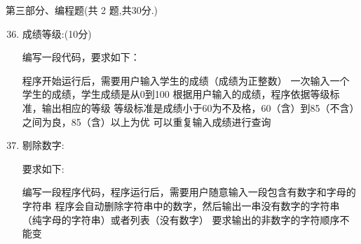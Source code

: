 \documentclass[11pt]{ctexart}
\begin{document}
    {\noindent\heiti 第三部分、编程题(共 2 题,共30分.)}
    \begin{enumerate}
        \setcounter{enumi}{35}
        
        \item 成绩等级:(10分)
        
        编写一段代码，要求如下：
        \begin{tasks}[label=\arabic*.]
            \task 程序开始运行后，需要用户输入学生的成绩（成绩为正整数）
            \task 一次输入一个学生的成绩，学生成绩是从0到100
            \task 根据用户输入的成绩，程序依据等级标准，输出相应的等级
            \task 等级标准是成绩小于60为不及格，60（含）到85（不含）之间为良，85（含）以上为优
            \task 可以重复输入成绩进行查询
        \end{tasks}
        \vfill

        \item 剔除数字:
        
        要求如下:
        \begin{tasks}[label=\arabic*.]
            \task 编写一段程序代码，程序运行后，需要用户随意输入一段包含有数字和字母的字符串
            \task 程序会自动删除字符串中的数字，然后输出一串没有数字的字符串（纯字母的字符串）或者列表（没有数字）
            \task 要求输出的非数字的字符顺序不能变
        \end{tasks}
        \vfill
    \end{enumerate}
\end{document}
